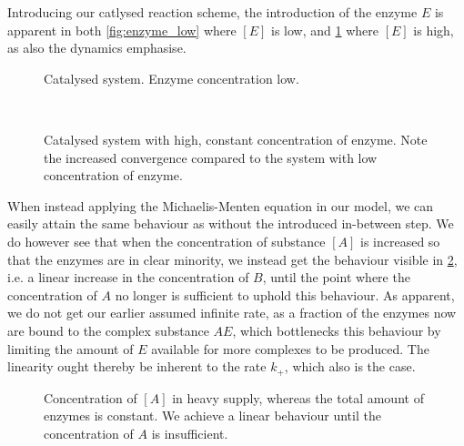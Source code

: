 \documentclass[a4paper,12pt]{article}
\theoremstyle{plain}
\theoremstyle{definition}
\begin{document}
      Introducing our catlysed reaction scheme, the introduction of the enzyme
      $E$ is apparent in both \cref{fig:enzyme_low} where $[E]$ is low, and
      \cref{fig:enzyme_high} where $[E]$ is high, as also the dynamics
      emphasise. 

      \begin{figure}[H]
         \vspace*{1cm}
         \hspace*{-2cm}
         \centering
         \begin{minipage}[t]{.6\textwidth}		
            \vspace{0pt}
            \centering
            \resizebox{\columnwidth}{!}{}
            \caption{Catalysed system. Enzyme concentration low.}
            \label{fig:enzyme_low}
         \end{minipage}~\hspace*{1em}
         \begin{minipage}[t]{.6\textwidth}		
            \vspace{0pt}
            \centering
            \resizebox{\columnwidth}{!}{}
            \caption{Catalysed system with high, constant concentration of
               enzyme. Note the increased convergence compared to the system
               with low concentration of enzyme.}
            \label{fig:enzyme_high}
         \end{minipage}
      \end{figure}

      When instead applying the Michaelis-Menten equation in our model, we can
      easily attain the same behaviour as without the introduced in-between
      step. We do however see that when the concentration of substance $[A]$ is 
      increased so that the enzymes are in clear minority, we instead get the 
      behaviour visible in \cref{fig:mm}, i.e. a linear increase in the
      concentration of $B$, until the point where the concentration of
      $A$ no longer is sufficient to uphold this behaviour. As apparent, we do
      not get our earlier assumed infinite rate, as a fraction of the enzymes
      now are bound to the complex substance $AE$, which bottlenecks this
      behaviour by limiting the amount of $E$ available for more complexes to be
      produced. The linearity ought thereby be inherent to the rate $k_+$, which
      also is the case.

      \begin{figure}[H]
         \centering
         \resizebox{.7\columnwidth}{!}{}
         \caption{Concentration of $[A]$ in heavy supply, whereas the total
            amount of enzymes is constant. We achieve a linear behaviour until
            the concentration of $A$ is insufficient. }
         \label{fig:mm}
      \end{figure}
\end{document}
